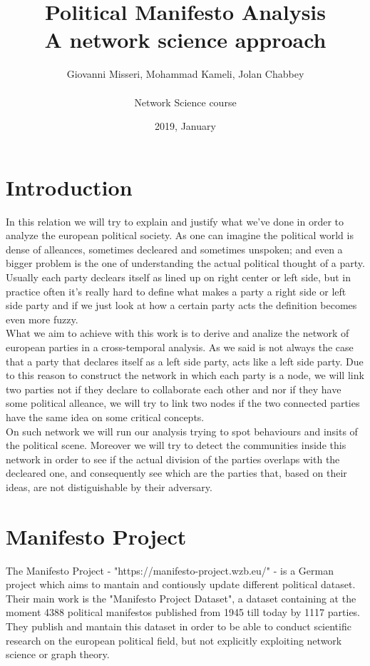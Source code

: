 \documentclass{article}%
\title{%
  Political Manifesto Analysis \\
  \large A network science approach}
\date{2019, January}
\author{Giovanni Misseri, Mohammad Kameli, Jolan Chabbey \\ \\ 
Network Science course}
\begin{document}
\maketitle
\section{Introduction}
In this relation we will try to explain and justify what we've done in order to analyze the european political society.
As one can imagine the political world is dense of alleances, sometimes decleared and sometimes unspoken; and even a bigger problem is the one of understanding the actual political thought of a party.
Usually each party declears itself as lined up on right center or left side, but in practice often it's really hard to define what makes a party a right side or left side party and if we just look at how a certain party acts the definition becomes even more fuzzy.\\

What we aim to achieve with this work is to derive and analize the network of european parties in a cross-temporal analysis. As we said is not always the case that a party that declares itself as a left side party, acts like a left side party. Due to this reason to construct the network in which each party is a node, we will link two parties not if they declare to collaborate each other and nor if they have some political alleance, we will try to link two nodes if the two connected parties have the same idea on some critical concepts.\\

On such network we will run our analysis trying to spot behaviours and insits of the political scene. Moreover we will try to detect the communities inside this network in order to see if the actual division of the parties overlaps with the decleared one, and consequently see which are the parties that, based on their ideas, are not distiguishable by their adversary.

\section*{Manifesto Project}

The Manifesto Project - "https://manifesto-project.wzb.eu/" - is a German project which aims to mantain and contiously update different political dataset. Their main work is the "Manifesto Project Dataset", a dataset containing at the moment 4388 political manifestos published from 1945 till today by 1117 parties.
They publish and mantain this dataset in order to be able to conduct scientific research on the european political field, but not explicitly exploiting network science or graph theory.
\end{document}
